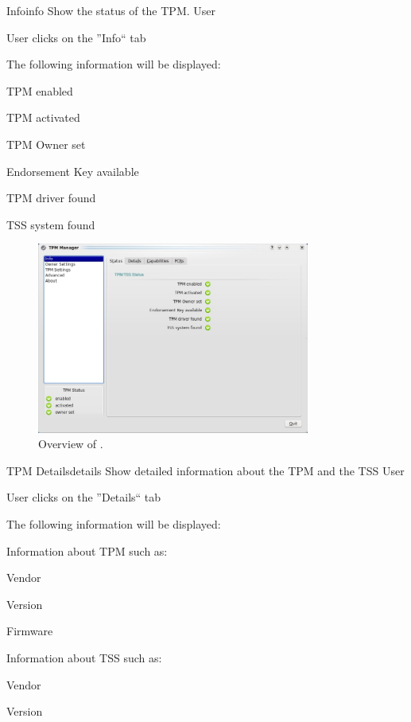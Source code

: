 \documentclass[
  american        %
]{sirrixreport}
\begin{document}
\begin{usecase}{Info}{info}
\ucdesc Show the status of the TPM.
\ucactors  User
\ucnormal 
 \item User clicks on the ''Info`` tab
 \item The following information will be displayed:
   \begin{compactitem}
   \item TPM enabled
   \item TPM activated
   \item TPM Owner set
   \item Endorsement Key available
   \item TPM driver found
   \item TSS system found
   \end{compactitem}
\ucendflow 
\end{usecase}


\begin{figure}[h]
\centering
\includegraphics[width=0.8\textwidth]{images/uc10.jpg}
\caption{Overview of .}
\end{figure}
\clearpage

\begin{usecase}{TPM Details}{details}
\ucdesc Show detailed information about the TPM and the TSS
\ucactors  User
\ucnormal 
 \item User clicks on the ''Details`` tab
 \item The following information will be displayed:
   \begin{compactitem}
   \item Information about TPM such as:
      \begin{compactitem}
         \item Vendor
         \item Version
         \item Firmware
      \end{compactitem}
   \item Information about TSS such as:
      \begin{compactitem}
         \item Vendor
         \item Version
      \end{compactitem}
   \end{compactitem}
\ucendflow 
\end{usecase}
\end{document}
